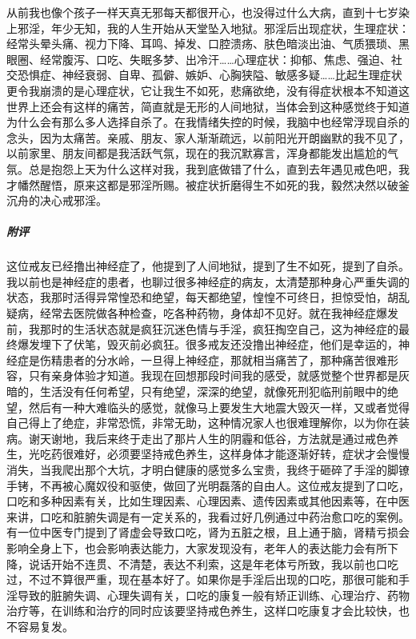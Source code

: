 \begin{case}
    从前我也像个孩子一样天真无邪每天都很开心，也没得过什么大病，直到十七岁染上邪淫，年少无知，我的人生开始从天堂坠入地狱。邪淫后出现症状，生理症状：经常头晕头痛、视力下降、耳鸣、掉发、口腔溃疡、肤色暗淡出油、气质猥琐、黑眼圈、经常腹泻、口吃、失眠多梦、出冷汗……心理症状：抑郁、焦虑、强迫、社交恐惧症、神经衰弱、自卑、孤僻、嫉妒、心胸狭隘、敏感多疑……比起生理症状更令我崩溃的是心理症状，它让我生不如死，悲痛欲绝，没有得症状根本不知道这世界上还会有这样的痛苦，简直就是无形的人间地狱，当体会到这种感觉终于知道为什么会有那么多人选择自杀了。在我情绪失控的时候，我脑中也经常浮现自杀的念头，因为太痛苦。亲戚、朋友、家人渐渐疏远，以前阳光开朗幽默的我不见了，以前家里、朋友间都是我活跃气氛，现在的我沉默寡言，浑身都能发出尴尬的气氛。总是抱怨上天为什么这样对我，我到底做错了什么，直到去年遇见戒色吧，我才幡然醒悟，原来这都是邪淫所赐。被症状折磨得生不如死的我，毅然决然以破釜沉舟的决心戒邪淫。
    \subparagraph{附评} 这位戒友已经撸出神经症了，他提到了人间地狱，提到了生不如死，提到了自杀。我以前也是神经症的患者，也聊过很多神经症的病友，太清楚那种身心严重失调的状态，我那时活得异常惶恐和绝望，每天都绝望，惶惶不可终日，担惊受怕，胡乱疑病，经常去医院做各种检查，吃各种药物，身体却不见好。就在我神经症爆发前，我那时的生活状态就是疯狂沉迷色情与手淫，疯狂掏空自己，这为神经症的最终爆发埋下了伏笔，毁灭前必疯狂。很多戒友还没撸出神经症，他们是幸运的，神经症是伤精患者的分水岭，一旦得上神经症，那就相当痛苦了，那种痛苦很难形容，只有亲身体验才知道。我现在回想那段时间我的感受，就感觉整个世界都是灰暗的，生活没有任何希望，只有绝望，深深的绝望，就像死刑犯临刑前眼中的绝望，然后有一种大难临头的感觉，就像马上要发生大地震大毁灭一样，又或者觉得自己得上了绝症，非常恐慌，非常无助，这种情况家人也很难理解你，以为你在装病。谢天谢地，我后来终于走出了那片人生的阴霾和低谷，方法就是通过戒色养生，光吃药很难好，必须要坚持戒色养生，这样身体才能逐渐好转，症状才会慢慢消失，当我爬出那个大坑，才明白健康的感觉多么宝贵，我终于砸碎了手淫的脚镣手铐，不再被心魔奴役和驱使，做回了光明磊落的自由人。这位戒友提到了口吃，口吃和多种因素有关，比如生理因素、心理因素、遗传因素或其他因素等，在中医来讲，口吃和脏腑失调是有一定关系的，我看过好几例通过中药治愈口吃的案例。有一位中医专门提到了肾虚会导致口吃，肾为五脏之根，且上通于脑，肾精亏损会影响全身上下，也会影响表达能力，大家发现没有，老年人的表达能力会有所下降，说话开始不连贯、不清楚，表达不利索，这是年老体亏所致，我以前也口吃过，不过不算很严重，现在基本好了。如果你是手淫后出现的口吃，那很可能和手淫导致的脏腑失调、心理失调有关，口吃的康复一般有矫正训练、心理治疗、药物治疗等，在训练和治疗的同时应该要坚持戒色养生，这样口吃康复才会比较快，也不容易复发。
\end{case}


